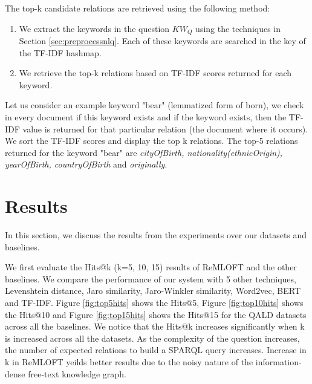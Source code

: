 The top-k candidate relations are retrieved using the following method: 
\begin{enumerate}
    \item  We extract the keywords in the question $KW_{Q}$ using the techniques in Section \ref{sec:preprocessnlq}. Each of these keywords are searched in the key of the TF-IDF hashmap.
    \item We retrieve the top-k relations based on TF-IDF scores returned for each keyword.
\end{enumerate}
Let us consider an example keyword "bear" (lemmatized form of born), we check in every document if this keyword exists and if the keyword exists, then the TF-IDF value is returned for that particular relation (the document where it occurs). We sort the TF-IDF scores and display the top k relations. The top-5 relations returned for the keyword "bear" are \textit{cityOfBirth, nationality(ethnicOrigin), yearOfBirth, countryOfBirth} and \textit{originally}.

\section{Results}
In this section, we discuss the results from the experiments over our datasets and baselines.

We first evaluate the Hits@k (k=5, 10, 15) results of ReMLOFT and the other baselines. We compare the performance of our system with 5 other techniques, Levenshtein distance, Jaro similarity, Jaro-Winkler similarity, Word2vec, BERT and TF-IDF. Figure \ref{fig:top5hits} shows the Hits@5, Figure \ref{fig:top10hits} shows the Hits@10 and Figure \ref{fig:top15hits} shows the Hits@15 for the QALD datasets across all the baselines. We notice that the Hits@k increases significantly when k is increased across all the datasets. 
As the complexity of the question increases, the number of expected relations to build a SPARQL query increases. 
Increase in k in ReMLOFT yeilds better results due to the noisy nature of the information-dense free-text knowledge graph.


